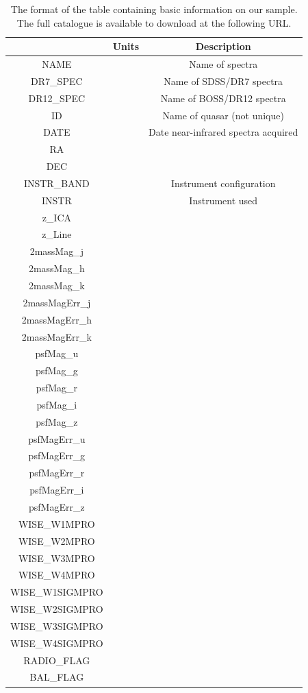 \begin{table}
  \centering
  \vspace*{-0.4cm}
  \caption{The format of the table containing basic information on our sample. The full catalogue is available to download at the following URL.}
  \label{tab:nirdatabase}
  \vspace*{-0.1cm}
  \begin{minipage}{16cm}
  \centering
    \begin{tabular}{ccc} 
    \hline
    & Units & Description \\ 
    \hline
    NAME & & Name of spectra  \\
    DR7\_SPEC & & Name of SDSS/DR7 spectra \\
    DR12\_SPEC & & Name of BOSS/DR12 spectra \\
    ID & & Name of quasar (not unique) \\
    DATE & & Date near-infrared spectra acquired  \\
    RA & & \\
    DEC & & \\
    INSTR\_BAND & & Instrument configuration \\
    INSTR & & Instrument used \\
    z\_ICA & & \\
    z\_Line & & \\
    2massMag\_j & & \\
    2massMag\_h & & \\
    2massMag\_k & & \\
    2massMagErr\_j & & \\
    2massMagErr\_h & & \\
    2massMagErr\_k & & \\
    psfMag\_u & & \\
    psfMag\_g & & \\
    psfMag\_r & & \\
    psfMag\_i & & \\
    psfMag\_z & & \\
    psfMagErr\_u & & \\
    psfMagErr\_g & & \\
    psfMagErr\_r & & \\
    psfMagErr\_i & & \\
    psfMagErr\_z & & \\
    WISE\_W1MPRO & & \\
    WISE\_W2MPRO & & \\
    WISE\_W3MPRO & & \\
    WISE\_W4MPRO & & \\
    WISE\_W1SIGMPRO & & \\
    WISE\_W2SIGMPRO & & \\
    WISE\_W3SIGMPRO & & \\
    WISE\_W4SIGMPRO & & \\
    RADIO\_FLAG & & \\
    BAL\_FLAG & & \\
    \hline
    \end{tabular}
  \vspace*{-0.4cm}
  \end{minipage}
\end{table}





